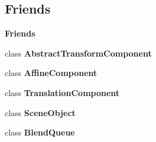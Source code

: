 \subsection*{Friends}
\begin{Indent}\textbf{ Friends}\par
\begin{DoxyCompactItemize}
\item 
\mbox{\label{classrev_1_1_transform_adbc81f81baaebf537a269803f0abfa66}} 
class {\bfseries Abstract\+Transform\+Component}
\item 
\mbox{\label{classrev_1_1_transform_a12e775e92a2c790f38385b72d54e402f}} 
class {\bfseries Affine\+Component}
\item 
\mbox{\label{classrev_1_1_transform_a9e98b885d1d9807d050c2b5fa67f781c}} 
class {\bfseries Translation\+Component}
\item 
\mbox{\label{classrev_1_1_transform_a737b3cb474f324a74e7da2d3aeca10c9}} 
class {\bfseries Scene\+Object}
\item 
\mbox{\label{classrev_1_1_transform_aacf451d09c33bff0c7868b019f411fe8}} 
class {\bfseries Blend\+Queue}
\end{DoxyCompactItemize}
\end{Indent}
